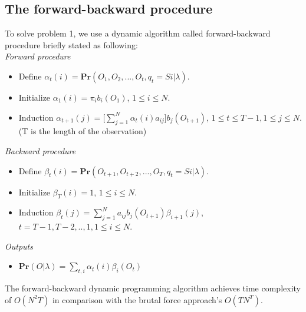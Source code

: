 \documentclass[english]{article}
\begin{document}
\subsection {The forward-backward procedure}
To solve problem 1, we use a dynamic algorithm called forward-backward procedure briefly stated as following: \\
\emph{Forward procedure}\\
\begin{itemize}
\item Define $\alpha_t(i) = \mathbf{Pr}(O_1, O_2, ...,O_t, q_t = Si | \lambda)$.
\item Initialize $\alpha_1(i) = \pi_i b_i(O_1)$, $1 \leq i \leq N$.
\item Induction $\alpha_{t+1}(j) = \big[\sum_{j=1}^N \alpha_t(i)a_{ij}\big]b_j(O_{t+1})$, $1\leq t\leq T-1, 1\leq j\leq N$. (T is the length of the observation)
\end{itemize}
\emph{Backward procedure}\\
\begin{itemize}
\item Define $\beta_t(i) = \mathbf{Pr}(O_{t+1}, O_{t+2}, ...,O_T, q_t = Si | \lambda)$.
\item Initialize $\beta_T(i) = 1$, $1 \leq i \leq N$.
\item Induction $\beta_{t}(j) = \sum_{j=1}^N a_{ij}b_{j}(O_{t+1})\beta_{i+1}(j)$, $t = T-1, T-2, .., 1, 1\leq i\leq N$.
\end{itemize}
\emph{Outputs}
\begin{itemize}
\item $\mathbf{Pr}(O|\lambda) = \sum_{t,i} \alpha_t(i)\beta_i(O_t)$
\end{itemize}
The forward-backward dynamic programming algorithm achieves time complexity of $O(N^2T)$ in comparison with the brutal force approach's $O(TN^T)$.
\end{document}
